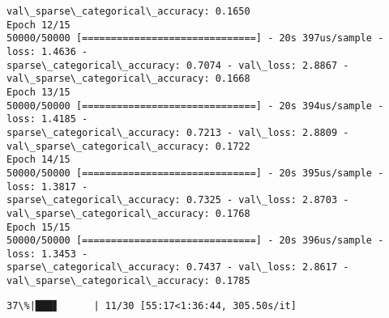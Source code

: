 \documentclass[11pt]{article}
\begin{document}
\begin{Verbatim}[commandchars=\\\{\}]
val\_sparse\_categorical\_accuracy: 0.1650
Epoch 12/15
50000/50000 [==============================] - 20s 397us/sample - loss: 1.4636 -
sparse\_categorical\_accuracy: 0.7074 - val\_loss: 2.8867 -
val\_sparse\_categorical\_accuracy: 0.1668
Epoch 13/15
50000/50000 [==============================] - 20s 394us/sample - loss: 1.4185 -
sparse\_categorical\_accuracy: 0.7213 - val\_loss: 2.8809 -
val\_sparse\_categorical\_accuracy: 0.1722
Epoch 14/15
50000/50000 [==============================] - 20s 395us/sample - loss: 1.3817 -
sparse\_categorical\_accuracy: 0.7325 - val\_loss: 2.8703 -
val\_sparse\_categorical\_accuracy: 0.1768
Epoch 15/15
50000/50000 [==============================] - 20s 396us/sample - loss: 1.3453 -
sparse\_categorical\_accuracy: 0.7437 - val\_loss: 2.8617 -
val\_sparse\_categorical\_accuracy: 0.1785
    \end{Verbatim}

    \begin{Verbatim}[commandchars=\\\{\}]
 37\%|███▋      | 11/30 [55:17<1:36:44, 305.50s/it]
    \end{Verbatim}
\end{document}

